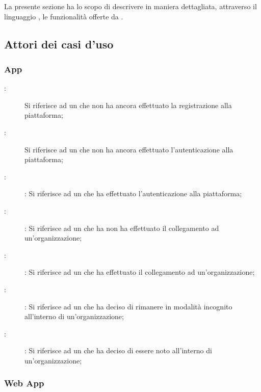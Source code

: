 \documentclass[../analisi-dei-requisiti]{subfiles}
\begin{document}
La presente sezione ha lo scopo di descrivere in maniera dettagliata, attraverso il linguaggio , le funzionalità offerte da .

\subsection{Attori dei casi d'uso}%
\label{sub:attori_casi_duso}

\subsubsection{App}%
\label{subsub:utenti}

\begin{description}
  \item[:] Si riferisce ad un  che non ha ancora effettuato la registrazione alla piattaforma;
  \item[:] Si riferisce ad un  che non ha ancora effettuato l'autenticazione alla piattaforma;
  \item[:]: Si riferisce ad un  che ha effettuato l'autenticazione alla piattaforma;
  \item[:]: Si riferisce ad un  che ha non ha effettuato il collegamento ad un'organizzazione;
  \item[:]: Si riferisce ad un  che ha effettuato il collegamento ad un'organizzazione;
  \item[:]: Si riferisce ad un  che ha deciso di rimanere in modalità incognito all'interno di un'organizzazione;
  \item[:]: Si riferisce ad un  che ha deciso di essere noto all'interno di un'organizzazione;
\end{description}

\subsubsection{Web App}%
\label{subsub:super_utenti}
\end{document}
